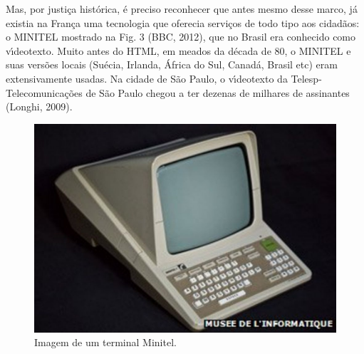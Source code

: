 \documentclass[
12pt,		%
openright,	%
twoside,  %
a4paper,			%
chapter=TITLE,		%
english,			%
french,				%
spanish,			%
brazil				%
]{USPSC-classe/USPSC}
\begin{document}
Mas, por justi\c{c}a hist\'orica, \'e preciso reconhecer que antes mesmo desse marco, j\'a existia na Fran\c{c}a uma tecnologia que oferecia servi\c{c}os de todo tipo aos cidad\~aos: o MINITEL mostrado na Fig. 3 (BBC, 2012), que no Brasil era conhecido como v\'{\i}deotexto. Muito antes do HTML, em meados da d\'ecada de 80, o MINITEL e suas vers\~oes locais (Su\'ecia, Irlanda, \'Africa do Sul, Canad\'a, Brasil etc) eram extensivamente usadas. Na cidade de S\~ao Paulo, o v\'{\i}deotexto da Telesp- Telecomunica\c{c}\~oes de S\~ao Paulo chegou a ter dezenas de milhares de assinantes  (Longhi, 2009).










\captionsetup{format=plain}
\begin{figure}[max size={\textwidth}{\textheight}]

\centering


\begin{minipage}[b]{0.4\linewidth}
        \centering
                \includegraphics[width=1.0\linewidth]{../../imagens/minitel.jpg}
                \caption{Imagem de um terminal Minitel.}
                \label{5d9a2782548e094108d5241aeff768916b33be6c}
\end{minipage}%
\hspace{0.5cm}
\end{figure}
\end{document}
